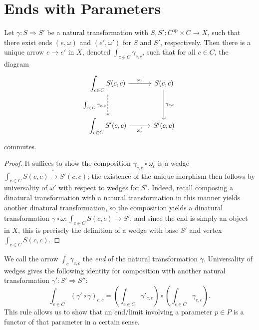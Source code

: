 \section{Ends with Parameters}

\begin{proposition}\label{prp:9.4}
	Let $\gamma : S \Rightarrow S'$ be a natural transformation with $S,S' : C^{\mathrm{op}} \times C \to X$, such that there exist ends $(e,\omega)$ and $(e',\omega')$ for $S$ and $S'$, respectively. Then there is a unique arrow $e\to e'$ in $X$, denoted $\int_{c\in C} \gamma_{c,c} $, such that for all $c\in C$, the diagram
	\[\begin{tikzcd}[row sep = 3em, column sep = 3em]
		\displaystyle{\int_{c\in C} S(c,c)}\ar[" \omega_c ", r] \ar[" \int_{c\in C} \gamma_{c\text{,} c}  "', dashed, d]  & S(c,c)\ar[" \gamma_{c\text{,} c}  ", d]  \\
		\displaystyle{\int_{c\in C} S'(c,c)}\ar[" \omega'_c "', r]  & S'(c,c)
	\end{tikzcd}\]
	commutes.
\end{proposition}
\begin{proof}
	It suffices to show the composition $\gamma_{c,c} \circ \omega_c$ is a wedge $ \int_{c\in C} S(c,c) \ddot{\to} S'(c,c)$; the existence of the unique morphism then follows by universality of $\omega'$ with respect to wedges for $S'$. Indeed, recall composing a dinatural transformation with a natural transformation in this manner yields another dinatural transformation, so the composition yields a dinatural transformation $\gamma \circ \omega : \int_{c\in C} S(c,c) \ddot{\to} S'$, and since the end is simply an object in $X$, this is precisely the definition of a wedge with base $S'$ and vertex $\int_{c\in C} S(c,c)$.
\end{proof}

We call the arrow $\int_{c} \gamma_{c,c} $ the \emph{end} of the natural transformation $\gamma$. Universality of wedges gives the following identity for composition with another natural transformation $\gamma' : S' \Rightarrow S''$:
\[
	\int_{c\in C} (\gamma' \circ \gamma)_{c,c} = \left( \int_{c\in C} \gamma'_{c,c}  \right) \circ \left( \int_{c\in C} \gamma_{c,c}  \right) 
.\]
This rule allows us to show that an end/limit involving a parameter $p\in P$ is a functor of that parameter in a certain sense.

